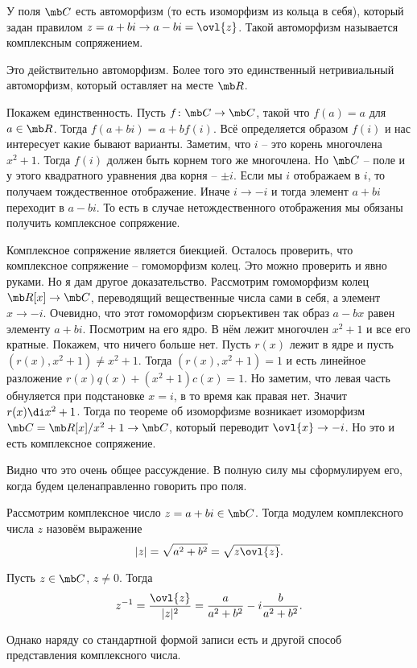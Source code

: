  У поля $\mb C$ есть автоморфизм (то есть изоморфизм из кольца в себя), который задан правилом $z=a+bi \to a-bi=\ovl{z}$. Такой автоморфизм называется комплексным сопряжением.
\edfn

\rm Это действительно автоморфизм. Более того это единственный нетривиальный автоморфизм, который оставляет на месте $\mb R$.

\proof Покажем единственность. Пусть $f\colon \mb C \to \mb C$, такой что $f(a)=a$ для $a\in \mb R$. Тогда $f(a+bi)=a+bf(i)$. Всё определяется образом $f(i)$ и нас интересует какие бывают варианты. Заметим, что $i$ -- это корень многочлена $x^2+1$. Тогда $f(i)$ должен быть корнем того же многочлена.  Но $\mb C$ -- поле и у этого квадратного уравнения два корня -- $\pm i$. Если мы $i$ отображаем в $i$, то получаем тождественное отображение. Иначе $i\to -i$ и тогда элемент $a+bi$ переходит в $a-bi$. То есть в случае нетождественного отображения мы обязаны получить комплексное сопряжение.

Комплексное сопряжение является биекцией. Осталось проверить, что комплексное сопряжение -- гомоморфизм колец. Это можно проверить и явно руками. Но я дам другое доказательство. Рассмотрим гомоморфизм колец $\mb R[x] \to \mb C$, переводящий вещественные числа сами в себя, а элемент $x \to -i$. Очевидно, что этот гомоморфизм сюръективен так образ $a-bx$ равен элементу $a+bi$. Посмотрим на его ядро. В нём лежит многочлен $x^2+1$ и все его кратные. Покажем, что ничего больше нет. Пусть $r(x)$ лежит в ядре и пусть $(r(x),x^2+1)\neq x^2+1$. Тогда $(r(x),x^2+1)=1$ и есть линейное разложение $r(x)q(x)+(x^2+1)c(x)=1$. Но заметим, что левая часть обнуляется при подстановке $x=i$, в то время как правая нет. Значит $r(x)\di x^2+1$. 
Тогда по теореме об изоморфизме возникает изоморфизм $\mb C= \mb R [x]/x^2+1 \to \mb C$, который переводит $\ovl{x} \to -i$. Но это и есть комплексное сопряжение.
\endproof
\erm

Видно что это очень общее рассуждение. В полную силу мы сформулируем его, когда будем целенаправленно говорить про поля.

 Рассмотрим комплексное число $z=a+bi\in \mb C$. Тогда модулем комплексного числа $z$ назовём выражение
$$|z|=\sqrt{a^2+b^2}=\sqrt{z\ovl{z}}.$$
\edfn

 Пусть $z\in \mb C$, $z\neq 0$. Тогда
$$ z^{-1} =\frac{\ovl{z}}{|z|^2}= \frac{a}{a^2+b^2}-i\frac{b}{a^2+b^2}.$$
\elm

Однако наряду со стандартной формой записи есть и другой способ представления комплексного числа.

